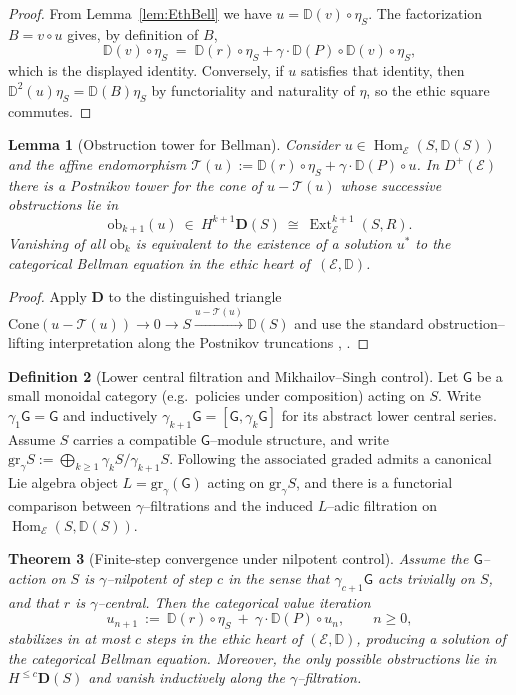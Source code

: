 \documentclass[12pt]{article}
\newcommand{\ob}{\mathrm{ob}}
\newcommand{\E}{\mathcal{E}}
\newcommand{\DD}{\mathbb{D}}
\newcommand{\Hom}{\operatorname{Hom}}
\newcommand{\Ext}{\operatorname{Ext}}
\theoremstyle{plain}
\newtheorem{theorem}{Theorem}[section]
\newtheorem{lemma}[theorem]{Lemma}
\theoremstyle{definition}
\newtheorem{definition}[theorem]{Definition}
\theoremstyle{remark}
\numberwithin{equation}{section}
\begin{document}
\begin{proof}
From Lemma~\ref{lem:EthBell} we have $u=\DD(v)\circ \eta_S$. The factorization $B=v\circ u$ gives, by definition of $B$,
\[
\DD(v)\circ \eta_S \;=\; \DD(r)\circ \eta_S + \gamma\cdot \DD(P)\circ \DD(v)\circ \eta_S,
\]
which is the displayed identity. Conversely, if $u$ satisfies that identity, then $\DD^2(u)\eta_S=\DD(B)\eta_S$ by functoriality and naturality of $\eta$, so the ethic square commutes.
\end{proof}

\begin{lemma}[Obstruction tower for Bellman]\label{lem:Obstruction}
Consider $u\in\Hom_{\E}(S,\DD(S))$ and the affine endomorphism $\mathcal T(u):=\DD(r)\circ \eta_S+\gamma\cdot \DD(P)\circ u$. In $D^{+}(\E)$ there is a Postnikov tower \cite{Postnikov1952,Whitehead1949,Neeman2001} for the cone of $u-\mathcal T(u)$ whose successive obstructions lie in
\[
\ob_{k+1}(u)\ \in\ H^{k+1}\mathbf D(S)\ \cong\ \Ext^{k+1}_{\E}(S,R).
\]
Vanishing of all $\ob_{k}$ is equivalent to the existence of a solution $u^\ast$ to the categorical Bellman equation in the ethic heart of~$(\E,\DD)$.
\end{lemma}

\begin{proof}
Apply $\mathbf D$ to the distinguished triangle $\mathrm{Cone}(u-\mathcal T(u))\to 0\to S\xrightarrow{u-\mathcal T(u)} \DD(S)$ and use the standard obstruction–lifting interpretation along the Postnikov truncations \cite{GelfandManin2003}, \cite{BBD1982}.
\end{proof}

\begin{definition}[Lower central filtration and Mikhailov–Singh control]
Let $\mathsf G$ be a small monoidal category (e.g.\ policies under composition) acting on $S$. Write $\gamma_1\mathsf G=\mathsf G$ and inductively $\gamma_{k+1}\mathsf G=[\mathsf G,\gamma_k\mathsf G]$ for its abstract lower central series. Assume $S$ carries a compatible $\mathsf G$–module structure, and write $\mathrm{gr}_\gamma S:=\bigoplus_{k\ge1} \gamma_k S/\gamma_{k+1}S$. Following \cite{MikhailovSingh2011} the associated graded admits a canonical Lie algebra object $L=\mathrm{gr}_\gamma(\mathsf G)$ acting on $\mathrm{gr}_\gamma S$, and there is a functorial comparison between $\gamma$–filtrations and the induced $L$–adic filtration on $\Hom_{\E}(S,\DD(S))$.
\end{definition}

\begin{theorem}[Finite-step convergence under nilpotent control]\label{thm:Nilpotent}
Assume the $\mathsf G$–action on $S$ is $\gamma$–nilpotent of step $c$ in the sense that $\gamma_{c+1}\mathsf G$ acts trivially on $S$, and that $r$ is $\gamma$–central. Then the categorical value iteration
\[
u_{n+1}\ :=\ \DD(r)\circ \eta_S\ +\ \gamma\cdot \DD(P)\circ u_n,\qquad n\ge 0,
\]
stabilizes in at most $c$ steps in the ethic heart of $(\E,\DD)$, producing a solution of the categorical Bellman equation. Moreover, the only possible obstructions lie in $H^{\le c}\mathbf D(S)$ and vanish inductively along the $\gamma$–filtration.
\end{theorem}
\end{document}
